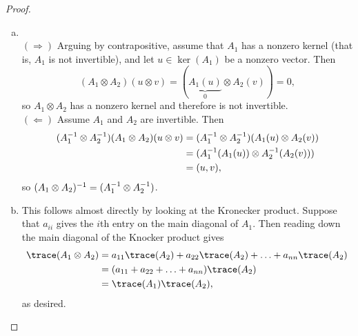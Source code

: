 \documentclass{article}
\begin{document}
\begin{proof} ~
  \begin{enumerate}[(a)]
    \item ~\\
    $(\Longrightarrow)$ Arguing by contrapositive, assume that $A_1$ has a nonzero
    kernel (that is, $A_1$ is not invertible), and let $u \in \ker(A_1)$ be a
    nonzero vector.
    Then \[
      (A_1 \otimes A_2)(u \otimes v) = (\underbrace{A_1(u)}_0 \otimes A_2(v)) = 0,
    \] so $A_1 \otimes A_2$ has a nonzero kernel and therefore is not invertible.
    \\
    $(\Longleftarrow)$ Assume $A_1$ and $A_2$ are invertible. Then \begin{align*}
      (A_1^{-1} \otimes A_2^{-1})(A_1 \otimes A_2)(u \otimes v)
      &= (A_1^{-1} \otimes A_2^{-1})(A_1(u) \otimes A_2(v))\\
      &= (A_1^{-1}(A_1(u)) \otimes A_2^{-1}(A_2(v))) \\
      &= (u,v),
    \end{align*}
    so $(A_1 \otimes A_2)^{-1} = (A_1^{-1} \otimes A_2^{-1})$.
    \item This follows almost directly by looking at the Kronecker product.
    Suppose that $a_{ii}$ gives the $i$th entry on the main diagonal of $A_1$.
    Then reading down the main diagonal of the Knocker product gives \begin{align*}
      \trace(A_1 \otimes A_2)
      &= a_{11}\trace(A_2) + a_{22}\trace(A_2) + \hdots + a_{nn}\trace(A_2) \\
      &= (a_{11} + a_{22} + \hdots + a_{nn})\trace(A_2) \\
      &= \trace(A_1)\trace(A_2),
    \end{align*}
    as desired.
  \end{enumerate}
\end{proof}
\end{document}
